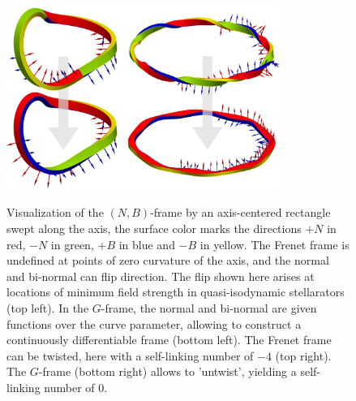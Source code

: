 \documentclass[12pt]{iopart}
\newcommand\hladdedrev[1]{#1} %
\newcommand\hlchangedrev[1]{#1} %
\newcommand\GFF{$G$-frame}
\newcommand\linknum[1]{\hlchangedrev{self-linking number{#1}}}
\newcommand\binormal[1]{bi-normal{#1}}
\begin{document}
\begin{figure}[htbp!]
    \centering
    \includegraphics[trim=0 0 0 0,clip,width=0.8\textwidth]{pics/explain_frenet/sign_change_and_untwist.pdf}\\
    \caption{Visualization of the $(N,B)$-frame by an axis-centered rectangle swept along the axis, the surface color marks the directions $+N$ in red, $-N$ in green, $+B$ in blue  and $-B$ in yellow. The Frenet frame is undefined at points of zero curvature of the axis, and \hlchangedrev{the normal and \binormal{ } can flip direction. The flip} shown here arises at locations of minimum field strength in quasi-isodynamic stellarators \cite{plunk_landreman_helander_2019} (top left). 
    \hladdedrev{In the \GFF{}, the normal and \binormal{ } are given functions over the curve parameter, allowing to construct} a continuously differentiable frame (bottom left). The Frenet frame  can be twisted, here with a \linknum{ } of $-4$ (top right). The \GFF{} (bottom right) allows to 'untwist', yielding a \linknum{ } of $0$.
    }
    \label{fig:signed_untwist}
\end{figure}
\end{document}
